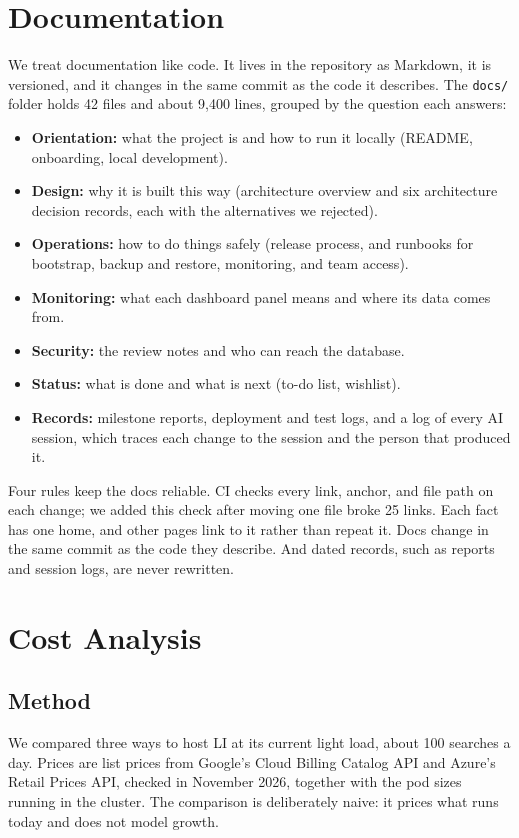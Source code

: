 \documentclass[conference]{IEEEtran}
\begin{document}
\section{Documentation}
\label{sec:docs}
We treat documentation like code. It lives in the repository as Markdown,
it is versioned, and it changes in the same commit as the code it
describes. The \texttt{docs/} folder holds 42 files and about 9,400 lines,
grouped by the question each answers:
\begin{itemize}
\item \textbf{Orientation:} what the project is and how to run it locally
(README, onboarding, local development).
\item \textbf{Design:} why it is built this way (architecture overview and
six architecture decision records, each with the alternatives we
rejected).
\item \textbf{Operations:} how to do things safely (release process, and
runbooks for bootstrap, backup and restore, monitoring, and team access).
\item \textbf{Monitoring:} what each dashboard panel means and where its
data comes from.
\item \textbf{Security:} the review notes and who can reach the database.
\item \textbf{Status:} what is done and what is next (to-do list,
wishlist).
\item \textbf{Records:} milestone reports, deployment and test logs, and a
log of every AI session, which traces each change to the session and the
person that produced it.
\end{itemize}
Four rules keep the docs reliable. CI checks every link, anchor, and file
path on each change; we added this check after moving one file broke 25
links. Each fact has one home, and other pages link to it rather than
repeat it. Docs change in the same commit as the code they describe. And
dated records, such as reports and session logs, are never rewritten.

\section{Cost Analysis}
\label{sec:cost}

\subsection{Method}
We compared three ways to host LI at its current light load, about 100
searches a day. Prices are list prices from Google's Cloud Billing Catalog
API and Azure's Retail Prices API, checked in November 2026, together with
the pod sizes running in the cluster. The comparison is deliberately naive:
it prices what runs today and does not model growth.
\end{document}
